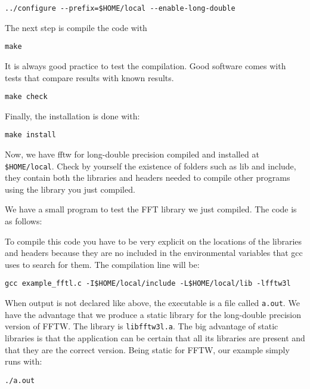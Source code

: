 \begin{lstlisting}
../configure --prefix=$HOME/local --enable-long-double
\end{lstlisting}

The next step is compile the code with

\begin{lstlisting}
make
\end{lstlisting}

It is always good practice to test the compilation. Good software comes with tests that compare results with known results.

\begin{lstlisting}
make check
\end{lstlisting}

Finally, the installation is done with:

\begin{lstlisting}
make install
\end{lstlisting}

Now, we have fftw for long-double precision compiled and installed at \verb|$HOME/local|. Check by yourself the existence of folders such as lib and include, they contain both the libraries and headers needed to compile other programs using the library you just compiled.

We have a small program to test the FFT library we just compiled. The code is as follows:



To compile this code you have to be very explicit on the locations of the libraries and headers because they are no included in the environmental variables that gcc uses to search for them. The compilation line will be:

\begin{lstlisting}
gcc example_fftl.c -I$HOME/local/include -L$HOME/local/lib -lfftw3l 
\end{lstlisting}

When output is not declared like above, the executable is a file called \texttt{a.out}. 
We have the advantage that we produce a static library for the long-double precision version of FFTW. The library is \texttt{libfftw3l.a}. The big advantage of static libraries is that the application can be certain that all its libraries are present and that they are the correct version. Being static for FFTW, our example simply runs with:

\begin{lstlisting}
./a.out
\end{lstlisting}

